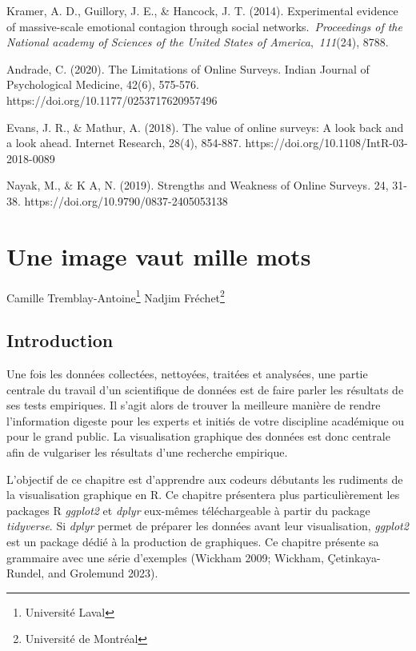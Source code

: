 \documentclass[
  letterpaper,
]{scrbook}
\begin{document}
Kramer, A. D., Guillory, J. E., \& Hancock, J. T. (2014). Experimental
evidence of massive-scale emotional contagion through social
networks.~\emph{Proceedings of the National academy of Sciences of the
United States of America},~\emph{111}(24), 8788.

Andrade, C. (2020). The Limitations of Online Surveys. Indian Journal of
Psychological Medicine, 42(6), 575-576.
https://doi.org/10.1177/0253717620957496

\hfill\break
Evans, J. R., \& Mathur, A. (2018). The value of online surveys: A look
back and a look ahead. Internet Research, 28(4), 854-887.
https://doi.org/10.1108/IntR-03-2018-0089

\hfill\break
Nayak, M., \& K A, N. (2019). Strengths and Weakness of Online Surveys.
24, 31-38. https://doi.org/10.9790/0837-2405053138


\hypertarget{une-image-vaut-mille-mots}{%
\chapter{Une image vaut mille mots}\label{une-image-vaut-mille-mots}}

Camille Tremblay-Antoine\footnote{Université Laval} Nadjim
Fréchet\footnote{Université de Montréal}

\hypertarget{introduction-1}{%
\section{Introduction}\label{introduction-1}}

Une fois les données collectées, nettoyées, traitées et analysées, une
partie centrale du travail d'un scientifique de données est de faire
parler les résultats de ses tests empiriques. Il s'agit alors de trouver
la meilleure manière de rendre l'information digeste pour les experts et
initiés de votre discipline académique ou pour le grand public. La
visualisation graphique des données est donc centrale afin de vulgariser
les résultats d'une recherche empirique.

L'objectif de ce chapitre est d'apprendre aux codeurs débutants les
rudiments de la visualisation graphique en R. Ce chapitre présentera
plus particulièrement les packages R \emph{ggplot2} et \emph{dplyr}
eux-mêmes téléchargeable à partir du package \emph{tidyverse}. Si
\emph{dplyr} permet de préparer les données avant leur visualisation,
\emph{ggplot2} est un package dédié à la production de graphiques. Ce
chapitre présente sa grammaire avec une série d'exemples (Wickham 2009;
Wickham, Çetinkaya-Rundel, and Grolemund 2023).
\end{document}
